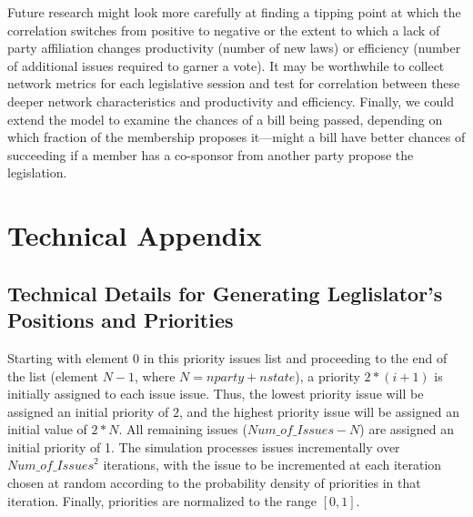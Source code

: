 \documentclass[pdftex,12pt]{llncs}
\begin{document}
Future research might look more carefully at finding a tipping point at which the correlation switches from positive to negative or the extent to which a lack of party affiliation changes productivity (number of new laws) or efficiency (number of additional issues required to garner a vote). 
It may be worthwhile to collect network metrics for each legislative session and test for correlation between these deeper network characteristics and productivity and efficiency. 
Finally, we could extend the model to examine the chances of a bill being passed, depending on which fraction of the membership proposes it---might a bill have better chances of succeeding if a member has a co-sponsor from another party propose the legislation. 

\newpage
\appendix
\section*{Technical Appendix} 
\label{App:appendixA}

\subsection*{Technical Details for Generating Leglislator's Positions and Priorities}
 
Starting with element 0 in this priority issues list and proceeding to the end of the list (element $N-1$, where $N = nparty + nstate$), a priority $2*(i + 1)$ is initially assigned to each issue issue.  
Thus, the lowest priority issue will be assigned an initial priority of $2$, and the highest priority issue will be assigned an initial value of $2 * N$.  
All remaining issues ($Num\_of\_Issues - N$) are assigned an initial priority of 1.  
The simulation processes issues incrementally over ${Num\_of\_Issues}^2$ iterations, with the issue to be incremented at each iteration chosen at random according to the probability density of priorities in that iteration.  
Finally, priorities are normalized to the range $[0,1]$.
\end{document}
